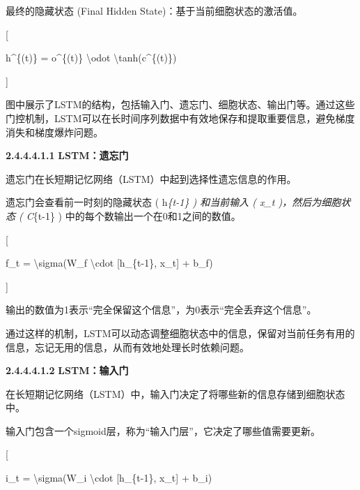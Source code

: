 最终的隐藏状态 (Final Hidden State)：基于当前细胞状态的激活值。

{[}

h\^{}\{(t)\} = o\^{}\{(t)\} \textbackslash odot
\textbackslash tanh(c\^{}\{(t)\})

{]}


图中展示了LSTM的结构，包括输入门、遗忘门、细胞状态、输出门等。通过这些门控机制，LSTM可以在长时间序列数据中有效地保存和提取重要信息，避免梯度消失和梯度爆炸问题。

\textbf{2.4.4.4.1.1} \textbf{LSTM：遗忘门}

遗忘门在长短期记忆网络（LSTM）中起到选择性遗忘信息的作用。


遗忘门会查看前一时刻的隐藏状态 ( h\emph{\{t-1\} ) 和当前输入 ( x\_t
)，然后为细胞状态 ( C}\{t-1\} ) 中的每个数输出一个在0和1之间的数值。

{[}

f\_t = \textbackslash sigma(W\_f \textbackslash cdot {[}h\_\{t-1\},
x\_t{]} + b\_f)

{]}


输出的数值为1表示``完全保留这个信息''，为0表示``完全丢弃这个信息''。

通过这样的机制，LSTM可以动态调整细胞状态中的信息，保留对当前任务有用的信息，忘记无用的信息，从而有效地处理长时依赖问题。

\textbf{2.4.4.4.1.2} \textbf{LSTM：输入门}

在长短期记忆网络（LSTM）中，输入门决定了将哪些新的信息存储到细胞状态中。


输入门包含一个sigmoid层，称为``输入门层''，它决定了哪些值需要更新。

{[}

i\_t = \textbackslash sigma(W\_i \textbackslash cdot {[}h\_\{t-1\},
x\_t{]} + b\_i)

